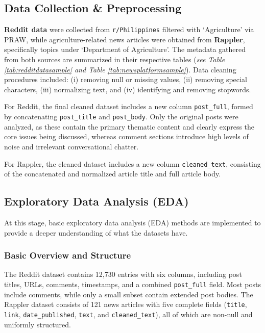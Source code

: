 \documentclass[conference]{IEEEtran}
\begin{document}
\subsection{Data Collection \& Preprocessing}

\textbf{Reddit data} were collected from \texttt{r/Philippines} filtered with `Agriculture' via PRAW, while agriculture-related news articles were obtained from \textbf{Rappler}, 
specifically topics under `Department of Agriculture'. 
The metadata gathered from both sources are summarized in their respective tables (\textit{see Table \ref{tab:redditdatasample} and Table \ref{tab:newsplatformsample}}). 
Data cleaning procedures included: (i) removing null or missing values, (ii) removing special characters, (iii) normalizing text, and (iv) identifying and removing stopwords.

For Reddit, the final cleaned dataset includes a new column \texttt{post\_full}, formed by concatenating \texttt{post\_title} and \texttt{post\_body}. 
Only the original posts were analyzed, as these contain the primary thematic content and clearly express the core issues being discussed, 
whereas comment sections introduce high levels of noise and irrelevant conversational chatter.

For Rappler, the cleaned dataset includes a new column \texttt{cleaned\_text}, consisting of the concatenated and normalized article title and full article body.

\vspace{1em}

\subsection{Exploratory Data Analysis (EDA)}

At this stage, basic exploratory data analysis (EDA) methods are implemented to provide a deeper understanding of what the datasets have.

\subsubsection{Basic Overview and Structure}

The Reddit dataset contains 12{,}730 entries with six columns, including post titles, URLs, comments, timestamps, and a combined \texttt{post\_full} field. Most posts include comments, while only a small subset contain extended post bodies.  
The Rappler dataset consists of 121 news articles with five complete fields (\texttt{title}, \texttt{link}, \texttt{date\_published}, \texttt{text}, and \texttt{cleaned\_text}), all of which are non-null and uniformly structured.
\end{document}
